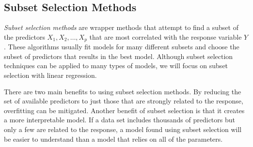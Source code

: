 \documentclass[final,onefignum,onetabnum]{siuro210301}
\begin{document}
	\subsection{Subset Selection Methods}
	
	\textit{Subset selection methods} are wrapper methods that attempt to find a subset of the predictors $X_1, X_2, \dotsc, X_p$ that are most correlated with the response variable $Y$. These algorithms usually fit models for many different subsets and choose the subset of predictors that results in the best model. Although subset selection techniques can be applied to many types of models, we will focus on subset selection with linear regression.
	
	There are two main benefits to using subset selection methods. By reducing the set of available predictors to just those that are strongly related to the response, overfitting can be mitigated. Another benefit of subset selection is that it creates a more interpretable model. If a data set includes thousands of predictors but only a few are related to the response, a model found using subset selection will be easier to understand than a model that relies on all of the parameters. 
	

	
\end{document}
